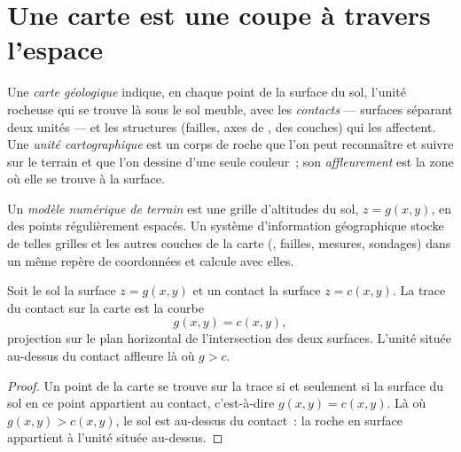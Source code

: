 \section{Une carte est une coupe à travers l'espace}\label{sec:b1:geological-maps:cut}

\begin{definition}\label{def:b1:geological-maps:geological-map}
Une \emph{carte géologique} indique, en chaque point de la surface du
sol, l'unité rocheuse qui se trouve là sous le sol meuble, avec les
\emph{contacts} --- surfaces séparant deux unités --- et les structures
(failles, axes de ,  des couches) qui les affectent. Une
\emph{unité cartographique} est un corps de roche que l'on peut reconnaître et
suivre sur le terrain et que l'on dessine d'une seule couleur~; son
\emph{affleurement} est la zone où elle se trouve à la
surface.
\end{definition}

\begin{definition}\label{def:b1:geological-maps:dem}
Un \emph{modèle numérique de terrain} est une grille d'altitudes du
sol, $z = g(x,y)$, en des points régulièrement espacés. Un système
d'information géographique stocke de telles grilles et les autres couches de la
carte (, failles, mesures, sondages) dans un même repère de coordonnées
et calcule avec elles.
\end{definition}

\begin{proposition}\label{prop:b1:geological-maps:intersection}
Soit le sol la surface $z = g(x,y)$ et un contact la surface
$z = c(x,y)$. La trace du contact sur la carte est la courbe
\[
  g(x,y) = c(x,y),
\]
projection sur le plan horizontal de l'intersection des deux surfaces. L'unité
située au-dessus du contact affleure là où $g > c$.
\end{proposition}

\begin{proof}
Un point de la carte se trouve sur la trace si et seulement si la surface du sol
en ce point appartient au contact, c'est-à-dire $g(x,y) = c(x,y)$. Là où
$g(x,y) > c(x,y)$, le sol est au-dessus du contact~: la roche en surface
appartient à l'unité située au-dessus.
\end{proof}

